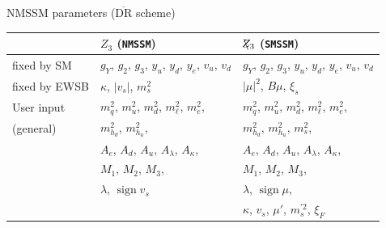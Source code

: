 \documentclass[hyperref={pdfpagelabels=false},ngerman]{beamer}
\DeclareMathOperator{\sign}{sign}
\newcommand{\DRbar}{\ensuremath{\overline{\text{DR}}}}
\newcommand{\Zv}{\ensuremath{\backslash\mkern-11.0mu{Z_3}}}
\begin{document}
\begin{frame}{NMSSM parameters ($\DRbar$ scheme)}
  \begin{table}[tbh]
    \footnotesize
    \centering
    \begin{tabularx}{\textwidth}{lXX}
      \toprule
      & $Z_3$ (\texttt{NMSSM}) & $\Zv$ (\texttt{SMSSM})\\
      \midrule
      fixed by SM
      & $g_Y$, $g_2$, $g_3$, $y_u$, $y_d$, $y_e$, $v_u$, $v_d$
      & $g_Y$, $g_2$, $g_3$, $y_u$, $y_d$, $y_e$, $v_u$, $v_d$
      \\\midrule
      fixed by EWSB
      & $\kappa$, $|v_s|$, $m_s^2$
      & $|\mu|^2$, $B\mu$, $\xi_s$
      \\\midrule
      User input
      & $m_q^2$, $m_u^2$,  $m_d^2$, $m_\ell^2$, $m_e^2$,
      & $m_q^2$, $m_u^2$,  $m_d^2$, $m_\ell^2$, $m_e^2$,\\
      (general)
      & $m_{h_d}^2$, $m_{h_u}^2$,
      & $m_{h_d}^2$, $m_{h_u}^2$, $m_s^2$,\\
      & $A_e$, $A_d$, $A_u$, $A_\lambda$, $A_\kappa$,
      & $A_e$, $A_d$, $A_u$, $A_\lambda$, $A_\kappa$,
      \\
      & $M_1$, $M_2$, $M_3$,
      & $M_1$, $M_2$, $M_3$,
      \\
      & $\lambda$, $\sign v_s$
      & $\lambda$, $\sign\mu$,
      \\
      & & $\kappa$, $v_s$, $\mu'$, $m_s^{\prime 2}$, $\xi_F$
      \\\bottomrule
    \end{tabularx}
  \end{table}
\end{frame}
\end{document}

